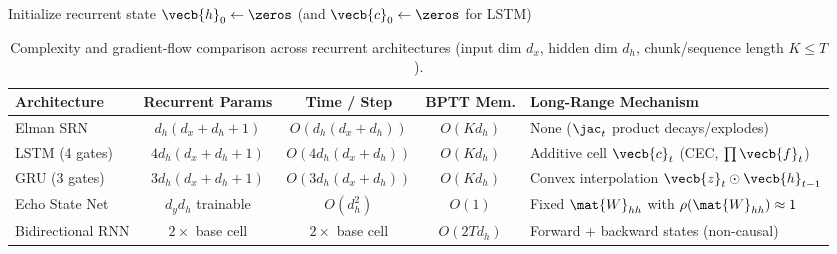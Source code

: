 \documentclass[../../../../master.tex]{subfiles}
\begin{document}
\begin{algorithm}[htbp]
\caption{Truncated BPTT with Hidden-State Carryover and Norm Gradient Clipping}
\label{alg:rnn:tbptt_clip}
Initialize recurrent state $\vecb{h}_0 \leftarrow \zeros$ (and $\vecb{c}_0 \leftarrow \zeros$ for LSTM)\;
\end{algorithm}

\begin{table}[htbp]
\centering
\caption{Complexity and gradient-flow comparison across recurrent architectures (input dim $d_x$, hidden dim $d_h$, chunk/sequence length $K \le T$).}
\label{tab:rnn:complexity}
\begin{tabularx}{\textwidth}{@{}lccc>{\raggedright\arraybackslash}X@{}}
\toprule
\textbf{Architecture} & \textbf{Recurrent Params} & \textbf{Time / Step} & \textbf{BPTT Mem.} & \textbf{Long-Range Mechanism} \\
\midrule
Elman SRN & $d_h(d_x + d_h + 1)$ & $O(d_h(d_x + d_h))$ & $O(K d_h)$ & None ($\jac_t$ product decays/explodes) \\
LSTM (4 gates) & $4 d_h(d_x + d_h + 1)$ & $O(4 d_h(d_x + d_h))$ & $O(K d_h)$ & Additive cell $\vecb{c}_t$ (CEC, $\prod \vecb{f}_t$) \\
GRU (3 gates) & $3 d_h(d_x + d_h + 1)$ & $O(3 d_h(d_x + d_h))$ & $O(K d_h)$ & Convex interpolation $\vecb{z}_t \odot \vecb{h}_{t-1}$ \\
Echo State Net & $d_y d_h$ trainable & $O(d_h^2)$ & $O(1)$ & Fixed $\mat{W}_{hh}$ with $\rho(\mat{W}_{hh}) \approx 1$ \\
Bidirectional RNN & $2\times$ base cell & $2\times$ base cell & $O(2 T d_h)$ & Forward + backward states (non-causal) \\
\bottomrule
\end{tabularx}
\end{table}
\end{document}
